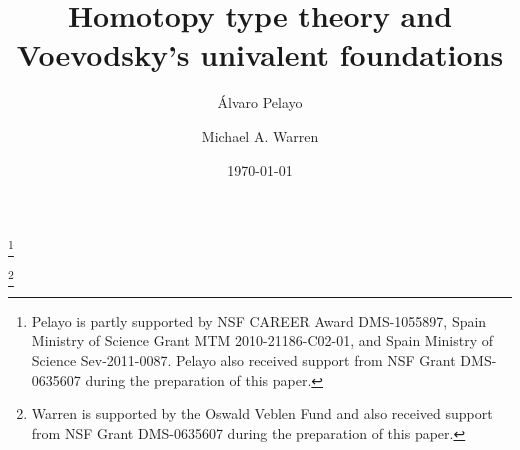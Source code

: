 \documentclass{amsart}
\theoremstyle{definition}
\theoremstyle{remark}
\numberwithin{equation}{section}
\begin{document}
\setcounter{myi}{0}

\title[Homotopy type theory]{Homotopy type theory and
  Voevodsky's univalent foundations}


\author[\'{A}. Pelayo]{\'{A}lvaro Pelayo}
\address{Washington University\\  
  Mathematics Department \\
  One Brookings Drive, Campus Box 1146\\
  St Louis, MO 63130, USA, AND School of Mathematics,
  Institute for Advanced Study\\
  Einstein Drive, Princeton\\
  NJ 08540 USA}
\thanks{Pelayo is partly supported by NSF CAREER Award DMS-1055897, Spain 
Ministry of Science Grant MTM 2010-21186-C02-01, and 
Spain Ministry of Science Sev-2011-0087.  Pelayo also received support
from NSF Grant DMS-0635607 during the preparation of this paper.}
\author[M. A. Warren]{Michael A. Warren}
\address{School of Mathematics,
  Institute for Advanced Study\\
  Einstein Drive, Princeton\\
  NJ 08540 USA.}
\curraddr{}
\thanks{Warren is supported by the Oswald Veblen Fund and also
  received support from NSF Grant DMS-0635607 during the preparation
  of this paper.}


\date{\today}

\dedicatory{}
\end{document}
